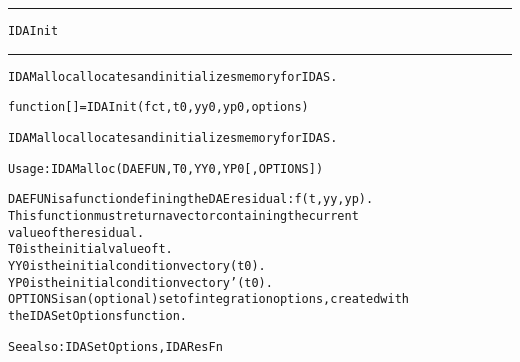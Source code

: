 \begin{samepage}
\hrule
\begin{center}
{\large \verb!IDAInit!}
\label{p:IDAInit}
\end{center}
\hrule\vspace{0.1in}



\begin{alltt}
IDAMalloc allocates and initializes memory for IDAS.
\end{alltt}

\end{samepage}



\begin{samepage}


\begin{alltt}
function [] = IDAInit(fct,t0,yy0,yp0,options) 
\end{alltt}

\end{samepage}



\begin{alltt}
IDAMalloc allocates and initializes memory for IDAS.

   Usage: IDAMalloc ( DAEFUN, T0, YY0, YP0 [, OPTIONS ] ) 

   DAEFUN   is a function defining the DAE residual: f(t,yy,yp).
            This function must return a vector containing the current 
            value of the residual.
   T0       is the initial value of t.
   YY0      is the initial condition vector y(t0).  
   YP0      is the initial condition vector y'(t0).  
   OPTIONS  is an (optional) set of integration options, created with
            the IDASetOptions function. 

  See also: IDASetOptions, IDAResFn
\end{alltt}






\vspace{0.1in}